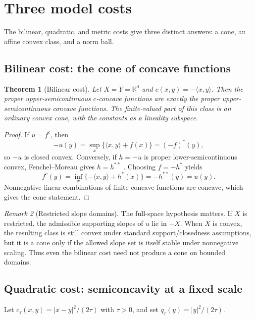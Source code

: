 \documentclass[11pt,a4paper]{article}
\newtheorem{theorem}{Theorem}[section]
\theoremstyle{definition}
\theoremstyle{remark}
\newtheorem{remark}[theorem]{Remark}
\newcommand{\R}{\mathbb R}
\begin{document}
\section{Three model costs}

The bilinear, quadratic, and metric costs give three distinct answers: a cone,
an affine convex class, and a norm ball.

\subsection{Bilinear cost: the cone of concave functions}

\begin{theorem}[Bilinear cost]\label{thm:bilinear}
Let $X=Y=\R^d$ and $c(x,y)=-\langle x,y\rangle$. Then the proper
upper-semicontinuous $c$-concave functions are exactly the proper
upper-semicontinuous concave functions. The finite-valued part of this class is
an ordinary convex cone, with the constants as a lineality subspace.
\end{theorem}

\begin{proof}
If $u=f^c$, then
\[
  -u(y)=\sup_x\{\langle x,y\rangle+f(x)\}=(-f)^*(y),
\]
so $-u$ is closed convex. Conversely, if $h=-u$ is proper lower-semicontinuous
convex, Fenchel--Moreau gives $h=h^{**}$ \citep{Rockafellar1970}. Choosing
$f=-h^*$ yields
\[
  f^c(y)=\inf_x\{-\langle x,y\rangle+h^*(x)\}=-h^{**}(y)=u(y).
\]
Nonnegative linear combinations of finite concave functions are concave, which
gives the cone statement.
\end{proof}

\begin{remark}[Restricted slope domains]
The full-space hypothesis matters. If $X$ is restricted, the admissible
supporting slopes of $u$ lie in $-X$. When $X$ is convex, the resulting class
is still convex under standard support/closedness assumptions, but it is a cone
only if the allowed slope set is itself stable under nonnegative scaling. Thus
even the bilinear cost need not produce a cone on bounded domains.
\end{remark}

\subsection{Quadratic cost: semiconcavity at a fixed scale}

Let $c_\tau(x,y)=\lvert x-y\rvert^2/(2\tau)$ with $\tau>0$, and set
$q_\tau(y)=\lvert y\rvert^2/(2\tau)$.
\end{document}
